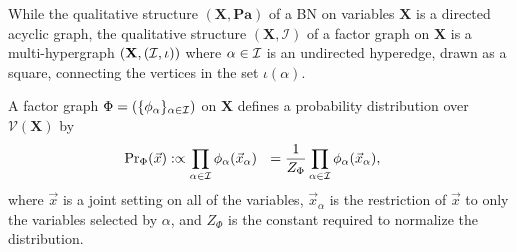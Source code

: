 \documentclass{article}
\newcommand{\V}{\mathcal V}
\newcommand{\N}{\mathcal N}
\newcommand{\Ed}{\mathcal E}
\numberwithin{equation}{section}
\begin{document}
	While the qualitative structure $(\mathbf X, \mathbf{Pa})$ of a BN on variables $\mathbf X$ is a directed acyclic graph, the qualitative structure $(\mathbf X, \mathcal I)$ of a factor graph on $\mathbf X$ is
	a multi-hypergraph $(\mathbf X, (\cal I, \iota))$ where
        $\alpha \in \cal I$ is an undirected hyperedge, drawn as a
        square, connecting the vertices in the set $\iota(\alpha)$.  
	
	
	
	
	A factor graph $\Phi = (\{\phi_\alpha\}_{\alpha \in \cal I})$ on $\mathbf X$ defines a probability distribution over $\V(\mathbf X)$ by 
	\begin{align*}
		\Pr\nolimits_\Phi(\vec x) &:\propto \prod_{\alpha \in \cal I} \phi_\alpha(\vec x_{\alpha}) 
		~~= \frac{1}{Z_\Phi} \prod_{\alpha \in \cal I}
                                \phi_\alpha(\vec x_{\alpha}), 
	\end{align*}
	where $\vec{x}$ is a joint setting on all of the variables, $\vec{x}_\alpha$ is the restriction of $\vec{x}$ to only the variables selected by $\alpha$, and $Z_\Phi$ is the constant required to normalize the distribution. 
		
%
\end{document}

